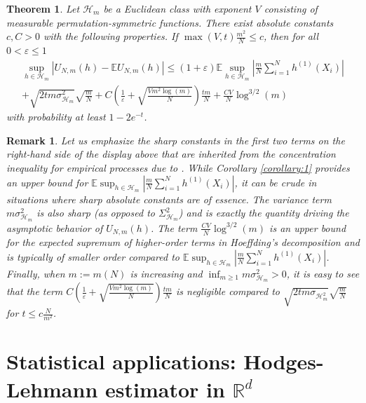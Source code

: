 \documentclass[12pt]{article}
\newcommand{\eps}{\varepsilon}
\def\l{\left}
\def\r{\right}
\newcommand{\m}{\mathcal}
\newcommand{\mb}{\mathbb}
\newtheorem{theorem}{Theorem}%
\theoremstyle{thmstyletwo}%
\newtheorem{remark}{Remark}%
\theoremstyle{thmstylethree}%
\begin{document}
\begin{theorem}
\label{thm:Bernstein-bound}
    Let $\mathcal{H}_m$ be a Euclidean class with exponent $V$ consisting of measurable permutation-symmetric functions. There exist absolute constants $c,C>0$ with the following properties. If $\max(V,t)\frac{m^2}{N}\leq c$, then for all $0<\eps\leq 1$
    \begin{multline*}
    \sup_{h\in \m H_m} \l| U_{N,m}(h) - \mb E U_{N,m}(h) \r| 
    \leq (1+\eps)\mb E\sup_{h\in \m H_m}\l|\frac{m}{N} \sum_{i=1}^N h^{(1)}\l(X_i\r)\r| 
    \\
    + \sqrt{2t m\sigma^2_{\m H_m}}\sqrt{\frac{m}{N}} +C\l(\frac{1}{\eps}+\sqrt{\frac{Vm^2\log(m)}{N}}\r)\frac{tm}{N}
    +\frac{CV}{N}\log^{3/2}(m)
\end{multline*}
with probability at least $1-2e^{-t}$.
\end{theorem}

\begin{remark}
\label{remark:explicit}
Let us emphasize the sharp constants in the first two terms on the right-hand side of the display above that are inherited from the concentration inequality for empirical processes due to \citet{bousquet2002bennett}. While Corollary \ref{corollary:1} provides an upper bound for $\mb E\sup_{h\in \m H_m}\l|\frac{m}{N} \sum_{i=1}^N h^{(1)}\l(X_i\r)\r|$, 
it  can be crude in situations where sharp absolute constants are of essence. The variance term $m\sigma^2_{\m H_m}$ is also sharp (as opposed to $\Sigma^2_{\m H_m}$) and is exactly the quantity driving the asymptotic behavior of $U_{N,m}(h)$. The term $\frac{CV}{N}\log^{3/2}(m)$ is an upper bound for the expected supremum of higher-order terms in Hoeffding's decomposition and is typically of smaller order compared to $\mb E\sup_{h\in \m H_m}\l|\frac{m}{N} \sum_{i=1}^N h^{(1)}\l(X_i\r)\r|$. 
Finally, when $m:=m(N)$ is increasing and $\inf_{m\geq 1} m\sigma^2_{\m H_m}>0$, it is easy to see that the term $C\l(\frac{1}{\eps}+\sqrt{\frac{Vm^2\log(m)}{N}}\r)\frac{tm}{N}$ is negligible compared to $ \sqrt{2t m\sigma_{\m H_m^2}}\sqrt{\frac{m}{N}}$ for $t\leq c \frac{N}{m^2}$.
\end{remark}



\section{Statistical applications: Hodges-Lehmann estimator in $\mb R^d$}
\label{sec:THL}
\end{document}
